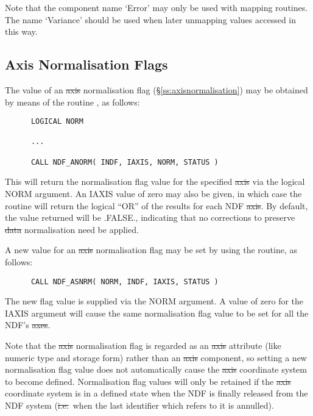 Note that the component name `Error' may only be used with mapping routines.
The name `Variance' should be used when later unmapping values accessed in
this way. 

\subsection{Axis Normalisation Flags}

The value of an \st{axis\/} normalisation flag
(\S\ref{ss:axisnormalisation}) may be obtained by means of the routine
, as follows: 

\small
\begin{verbatim}
      LOGICAL NORM

      ...

      CALL NDF_ANORM( INDF, IAXIS, NORM, STATUS )
\end{verbatim}
\normalsize

This will return the normalisation flag value for the specified \st{axis\/}
via the logical NORM argument. 
An IAXIS value of zero may also be given, in which case the routine will 
return the logical ``OR'' of the results for each NDF \st{axis}.
By default, the value returned will be .FALSE., indicating that no
corrections to preserve \st{data\/} normalisation need be applied.

A new value for an \st{axis\/} normalisation flag may be set by using the
 routine, as follows: 

\small
\begin{verbatim}
      CALL NDF_ASNRM( NORM, INDF, IAXIS, STATUS )
\end{verbatim}
\normalsize

The new flag value is supplied via the NORM argument.
A value of zero for the IAXIS argument will cause the same normalisation 
flag value to be set for all the NDF's \st{axes}.

Note that the \st{axis\/} normalisation flag is regarded as an \st{axis\/}
attribute (like numeric type and storage form) rather than an \st{axis\/}
component, so setting a new normalisation flag value does not automatically
cause the \st{axis\/} coordinate system to become defined. 
Normalisation flag values will only be retained if the \st{axis\/}
coordinate system is in a defined state when the NDF is finally released
from the NDF system (\st{i.e.}\ when the last identifier which refers to it
is annulled). 

